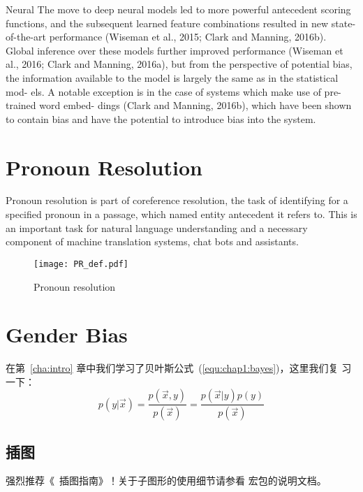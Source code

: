 Neural The move to deep neural models led to more powerful antecedent scoring functions, and the subsequent learned feature combinations resulted in new state-of-the-art performance (Wiseman et al., 2015; Clark and Manning, 2016b). Global inference over these models further improved performance (Wiseman et al., 2016; Clark and Manning, 2016a), but from the perspective of potential bias, the information available to the model is largely the same as in the statistical mod- els. A notable exception is in the case of systems which make use of pre-trained word embed- dings (Clark and Manning, 2016b), which have been shown to contain bias and have the potential to introduce bias into the system.

\section{Pronoun Resolution}

Pronoun resolution is part of coreference resolution, the task of identifying for a specified pronoun in a passage, which named entity antecedent it refers to. This is an important task for natural language understanding and a necessary component of machine translation systems, chat bots and assistants.
\begin{figure}[H] %
  \centering
  \texttt{[image: PR\_def.pdf]}
  \caption{Pronoun resolution}
  \label{fig:def}
\end{figure}


\section{Gender Bias}

\label{sec:other}

在第~\ref{cha:intro} 章中我们学习了贝叶斯公式~(\ref{equ:chap1:bayes})，这里我们复
习一下：
\begin{equation}
\label{equ:chap2:bayes}
p(y|\vec{x}) = \frac{p(\vec{x},y)}{p(\vec{x})}=
\frac{p(\vec{x}|y)p(y)}{p(\vec{x})}
\end{equation}


\subsection{插图}
\label{sec:graphs}

强烈推荐《\LaTeXe\ 插图指南》！关于子图形的使用细节请参看  宏包的说明文档。

